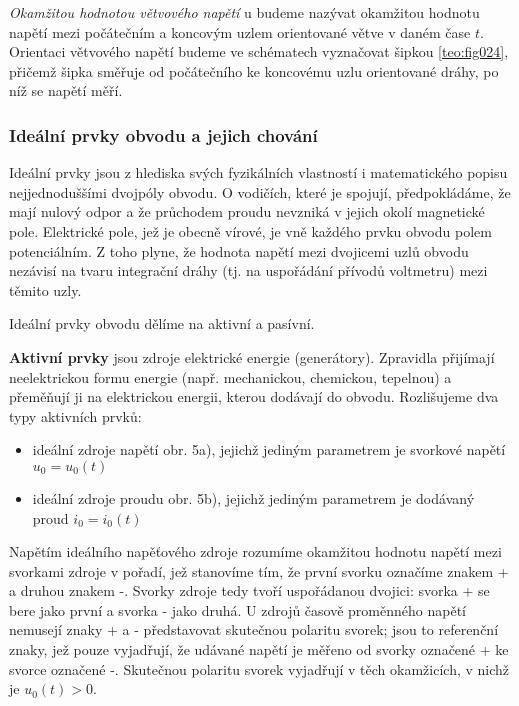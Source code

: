         \emph{Okamžitou hodnotou větvového napětí} u budeme nazývat okamžitou hodnotu napětí mezi 
        počátečním a koncovým uzlem orientované větve v daném čase \(t\). Orientaci větvového 
        napětí budeme ve schématech vyznačovat šipkou 
        \ref{teo:fig024}, přičemž šipka směřuje od počátečního ke koncovému uzlu 
        orientované dráhy, po níž se napětí měří.
        
      \subsubsection{Ideální prvky obvodu a jejich chování}
        Ideální prvky jsou z hlediska svých fyzikálních vlastností i matematického popisu 
        nejjednoduššími dvojpóly obvodu. O vodičích, které je spojují, předpokládáme, že mají 
        nulový odpor a že průchodem proudu nevzniká v jejich okolí magnetické pole. Elektrické 
        pole, jež je obecně vírové, je vně každého prvku obvodu polem potenciálním. Z toho plyne, 
        že hodnota napětí mezi dvojicemi uzlů obvodu nezávisí na tvaru integrační dráhy (tj. na 
        uspořádání přívodů voltmetru) mezi těmito uzly.
        
        Ideální prvky obvodu dělíme na aktivní a pasívní.
        
        \textbf{Aktivní prvky} jsou zdroje elektrické energie (generátory). Zpravidla přijímají 
        neelektrickou formu energie (např. mechanickou, chemickou, tepelnou) a přeměňují ji na 
        elektrickou energii, kterou dodávají do obvodu. Rozlišujeme dva typy aktivních prvků:
        \begin{itemize}
          \item ideální zdroje napětí obr. 5a), jejichž jediným parametrem je svorkové napětí     
                \(u_0 =  u_0(t)\)
          \item ideální zdroje proudu obr. 5b), jejichž jediným parametrem je dodávaný proud      
                \(i_0 = i_0(t)\)
        \end{itemize}
        
        Napětím ideálního napěťového zdroje rozumíme okamžitou hodnotu napětí mezi svorkami zdroje 
        v pořadí, jež stanovíme tím, že první svorku označíme znakem + a druhou znakem -. Svorky 
        zdroje tedy tvoří uspořádanou dvojici: svorka + se bere jako první a svorka - jako druhá. U 
        zdrojů časově proměnného napětí nemusejí znaky + a - představovat skutečnou polaritu 
        svorek; jsou to referenční znaky, jež pouze vyjadřují, že udávané napětí je měřeno od 
        svorky označené + ke svorce označené -. Skutečnou polaritu svorek vyjadřují v těch 
        okamžicích, v nichž je \(u_0(t) > 0\).
        
